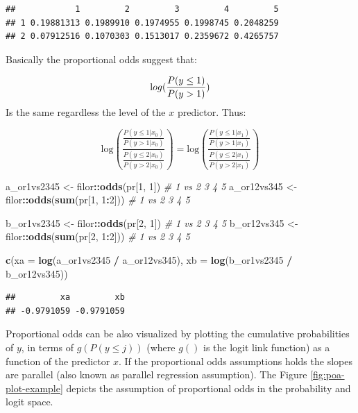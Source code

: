 \documentclass[
  man,floatsintext]{apa6}
\newenvironment{Shaded}{\begin{snugshade}}{\end{snugshade}}
\newcommand{\AttributeTok}[1]{\textcolor[rgb]{0.13,0.29,0.53}{#1}}
\newcommand{\CommentTok}[1]{\textcolor[rgb]{0.56,0.35,0.01}{\textit{#1}}}
\newcommand{\DecValTok}[1]{\textcolor[rgb]{0.00,0.00,0.81}{#1}}
\newcommand{\FunctionTok}[1]{\textcolor[rgb]{0.13,0.29,0.53}{\textbf{#1}}}
\newcommand{\NormalTok}[1]{#1}
\newcommand{\OtherTok}[1]{\textcolor[rgb]{0.56,0.35,0.01}{#1}}
\newcommand{\SpecialCharTok}[1]{\textcolor[rgb]{0.81,0.36,0.00}{\textbf{#1}}}
\begin{document}
\begin{verbatim}
##            1         2         3         4         5
## 1 0.19881313 0.1989910 0.1974955 0.1998745 0.2048259
## 2 0.07912516 0.1070303 0.1513017 0.2359672 0.4265757
\end{verbatim}

Basically the proportional odds suggest that:

\[
\text log(\frac{P(y \leq 1)}{P(y > 1)})
\]
Is the same regardless the level of the \(x\) predictor. Thus:

\[
\text{log}\left(\frac{\frac{P(y \leq 1|x_0)}{P(y > 1|x_0)}}{\frac{P(y \leq 2|x_0)}{P(y > 2|x_0)}}\right) = \text{log}\left(\frac{\frac{P(y \leq 1|x_1)}{P(y > 1|x_1)}}{\frac{P(y \leq 2|x_1)}{P(y > 2|x_1)}}\right)
\]

\begin{Shaded}
\begin{Highlighting}[]
\NormalTok{a\_or1vs2345 }\OtherTok{\textless{}{-}}\NormalTok{ filor}\SpecialCharTok{::}\FunctionTok{odds}\NormalTok{(pr[}\DecValTok{1}\NormalTok{, }\DecValTok{1}\NormalTok{]) }\CommentTok{\# 1 vs 2 3 4 5}
\NormalTok{a\_or12vs345 }\OtherTok{\textless{}{-}}\NormalTok{ filor}\SpecialCharTok{::}\FunctionTok{odds}\NormalTok{(}\FunctionTok{sum}\NormalTok{(pr[}\DecValTok{1}\NormalTok{, }\DecValTok{1}\SpecialCharTok{:}\DecValTok{2}\NormalTok{])) }\CommentTok{\# 1 vs 2 3 4 5}

\NormalTok{b\_or1vs2345 }\OtherTok{\textless{}{-}}\NormalTok{ filor}\SpecialCharTok{::}\FunctionTok{odds}\NormalTok{(pr[}\DecValTok{2}\NormalTok{, }\DecValTok{1}\NormalTok{]) }\CommentTok{\# 1 vs 2 3 4 5}
\NormalTok{b\_or12vs345 }\OtherTok{\textless{}{-}}\NormalTok{ filor}\SpecialCharTok{::}\FunctionTok{odds}\NormalTok{(}\FunctionTok{sum}\NormalTok{(pr[}\DecValTok{2}\NormalTok{, }\DecValTok{1}\SpecialCharTok{:}\DecValTok{2}\NormalTok{])) }\CommentTok{\# 1 vs 2 3 4 5}

\FunctionTok{c}\NormalTok{(}\AttributeTok{xa =} \FunctionTok{log}\NormalTok{(a\_or1vs2345 }\SpecialCharTok{/}\NormalTok{ a\_or12vs345), }\AttributeTok{xb =} \FunctionTok{log}\NormalTok{(b\_or1vs2345 }\SpecialCharTok{/}\NormalTok{ b\_or12vs345))}
\end{Highlighting}
\end{Shaded}

\begin{verbatim}
##         xa         xb 
## -0.9791059 -0.9791059
\end{verbatim}

Proportional odds can be also visualized by plotting the cumulative probabilities of \(y\), in terms of \(g(P(y \leq j))\) (where \(g()\) is the logit link function) as a function of the predictor \(x\). If the proportional odds assumptions holds the slopes are parallel (also known as parallel regression assumption). The Figure \ref{fig:poa-plot-example} depicts the assumption of proportional odds in the probability and logit space.
\end{document}
